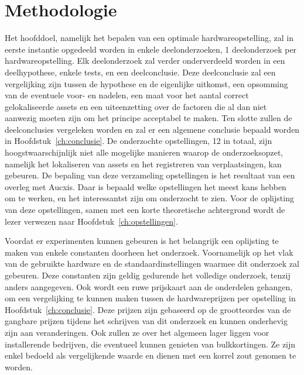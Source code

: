 
\chapter{Methodologie}
\label{ch:methodologie}

Het hoofddoel, namelijk het bepalen van een optimale hardwareopstelling, zal in eerste instantie opgedeeld worden in enkele deelonderzoeken, 1 deelonderzoek per hardwareopstelling. Elk deelonderzoek zal verder onderverdeeld worden in een deelhypothese, enkele tests, en een deelconclusie. Deze deelconclusie zal een vergelijking zijn tussen de hypothese en de eigenlijke uitkomst, een opsomming van de eventuele voor- en nadelen, een maat voor het aantal correct gelokaliseerde assets en een uiteenzetting over de factoren die al dan niet aanwezig moeten zijn om het principe acceptabel te maken. Ten slotte zullen de deelconclusies vergeleken worden en zal er een algemene conclusie bepaald worden in Hoofdstuk~\ref{ch:conclusie}. De onderzochte opstellingen, 12 in totaal, zijn hoogstwaarschijnlijk niet alle mogelijke manieren waarop de onderzoeksopzet, namelijk het lokaliseren van assets en het registreren van verplaatsingen, kan gebeuren. De bepaling van deze verzameling opstellingen is het resultaat van een overleg met Aucxis. Daar is bepaald welke opstellingen het meest kans hebben om te werken, en het interessantst zijn om onderzocht te zien. Voor de oplijsting van deze opstellingen, samen met een korte theoretische achtergrond wordt de lezer verwezen naar Hoofdstuk~\ref{ch:opstellingen}.

Voordat er experimenten kunnen gebeuren is het belangrijk een oplijsting te maken van enkele constanten doorheen het onderzoek. Voornamelijk op het vlak van de gebruikte hardware en de standaardinstellingen waarmee dit onderzoek zal gebeuren. Deze constanten zijn geldig gedurende het volledige onderzoek, tenzij anders aangegeven. Ook wordt een ruwe prijskaart aan de onderdelen gehangen, om een vergelijking te kunnen maken tussen de hardwareprijzen per opstelling in Hoofdstuk~\ref{ch:conclusie}. Deze prijzen zijn gebaseerd op de grootteordes van de gangbare prijzen tijdens het schrijven van dit onderzoek en kunnen onderhevig zijn aan veranderingen. Ook zullen ze over het algemeen lager liggen voor installerende bedrijven, die eventueel kunnen genieten van bulkkortingen. Ze zijn enkel bedoeld als vergelijkende waarde en dienen met een korrel zout genomen te worden.

